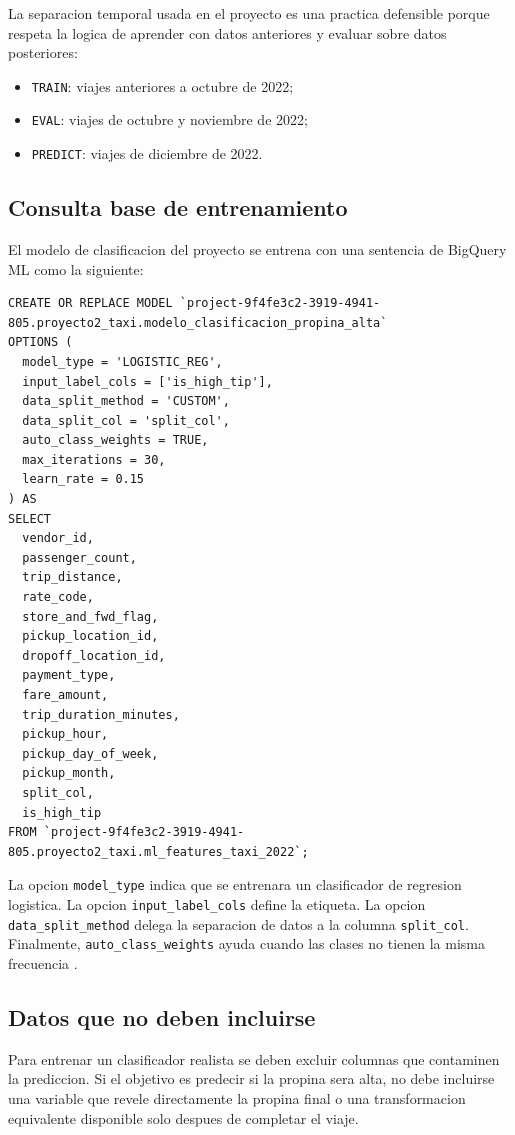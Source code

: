 \documentclass[12pt]{article}
\begin{document}
La separacion temporal usada en el proyecto es una practica defensible porque respeta la logica de aprender con datos anteriores y evaluar sobre datos posteriores:
\begin{itemize}[leftmargin=*]
\item \texttt{TRAIN}: viajes anteriores a octubre de 2022;
\item \texttt{EVAL}: viajes de octubre y noviembre de 2022;
\item \texttt{PREDICT}: viajes de diciembre de 2022.
\end{itemize}

\subsection{Consulta base de entrenamiento}
El modelo de clasificacion del proyecto se entrena con una sentencia de BigQuery ML como la siguiente:

\begin{lstlisting}[style=sql]
CREATE OR REPLACE MODEL `project-9f4fe3c2-3919-4941-805.proyecto2_taxi.modelo_clasificacion_propina_alta`
OPTIONS (
  model_type = 'LOGISTIC_REG',
  input_label_cols = ['is_high_tip'],
  data_split_method = 'CUSTOM',
  data_split_col = 'split_col',
  auto_class_weights = TRUE,
  max_iterations = 30,
  learn_rate = 0.15
) AS
SELECT
  vendor_id,
  passenger_count,
  trip_distance,
  rate_code,
  store_and_fwd_flag,
  pickup_location_id,
  dropoff_location_id,
  payment_type,
  fare_amount,
  trip_duration_minutes,
  pickup_hour,
  pickup_day_of_week,
  pickup_month,
  split_col,
  is_high_tip
FROM `project-9f4fe3c2-3919-4941-805.proyecto2_taxi.ml_features_taxi_2022`;
\end{lstlisting}

La opcion \texttt{model\_type} indica que se entrenara un clasificador de regresion logistica. La opcion \texttt{input\_label\_cols} define la etiqueta. La opcion \texttt{data\_split\_method} delega la separacion de datos a la columna \texttt{split\_col}. Finalmente, \texttt{auto\_class\_weights} ayuda cuando las clases no tienen la misma frecuencia \cite{gcp_create_glm}.

\subsection{Datos que no deben incluirse}
Para entrenar un clasificador realista se deben excluir columnas que contaminen la prediccion. Si el objetivo es predecir si la propina sera alta, no debe incluirse una variable que revele directamente la propina final o una transformacion equivalente disponible solo despues de completar el viaje.
\end{document}
